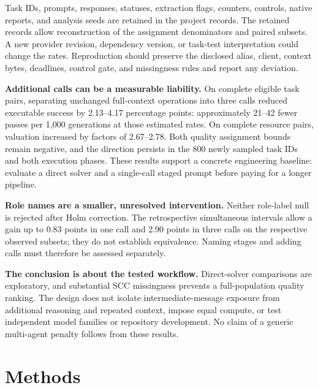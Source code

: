 \documentclass[pdflatex,sn-nature]{scientificreports}
\begin{document}
Task IDs, prompts, responses, statuses, extraction flags, counters, controls, native reports, and analysis seeds are retained in the project records. The retained records allow reconstruction of the assignment denominators and paired subsets. A new provider revision, dependency version, or task-test interpretation could change the rates. Reproduction should preserve the disclosed alias, client, context bytes, deadlines, control gate, and missingness rules and report any deviation.



\textbf{Additional calls can be a measurable liability.} On complete eligible task pairs, separating unchanged full-context operations into three calls reduced executable success by 2.13--4.17 percentage points: approximately 21--42 fewer passes per 1,000 generations at those estimated rates. On complete resource pairs, valuation increased by factors of 2.67--2.78. Both quality assignment bounds remain negative, and the direction persists in the 800 newly sampled task IDs and both execution phases. These results support a concrete engineering baseline: evaluate a direct solver and a single-call staged prompt before paying for a longer pipeline.

\textbf{Role names are a smaller, unresolved intervention.} Neither role-label null is rejected after Holm correction. The retrospective simultaneous intervals allow a gain up to 0.83 points in one call and 2.90 points in three calls on the respective observed subsets; they do not establish equivalence. Naming stages and adding calls must therefore be assessed separately.

\textbf{The conclusion is about the tested workflow.} Direct-solver comparisons are exploratory, and substantial SCC missingness prevents a full-population quality ranking. The design does not isolate intermediate-message exposure from additional reasoning and repeated context, impose equal compute, or test independent model families or repository development. No claim of a generic multi-agent penalty follows from these results.


\section{Methods}
\end{document}
